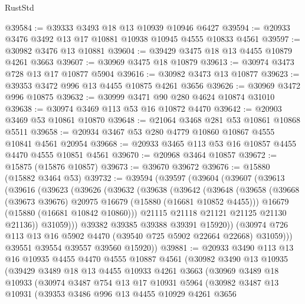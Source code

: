\begin{lexlean}{RustStd}
\begin{coremodule}
@39584 := @39333 @3493 @18 @13 @10939 @10946 @6427
@39594 := @20933 @3476 @3492 @13 @17 @10881 @10938 @10945 @4555 @10833 @4561
@39597 := @30982 @3476 @13 @10881
@39604 := @39429 @3475 @18 @13 @4455 @10879 @4261 @3663
@39607 := @30969 @3475 @18 @10879
@39613 := @30974 @3473 @728 @13 @17 @10877 @5904
@39616 := @30982 @3473 @13 @10877
@39623 := @39353 @3472 @996 @13 @4455 @10875 @4261 @3656
@39626 := @30969 @3472 @996 @10875
@39632 := @30999 @3471 @90 @280 @4624 @10874 @31010
@39638 := @30974 @3469 @113 @53 @16 @10872 @4470
@39642 := @20903 @3469 @53 @10861 @10870
@39648 := @21064 @3468 @281 @53 @10861 @10868 @5511
@39658 := @20934 @3467 @53 @280 @4779 @10860 @10867 @4555 @10841 @4561 @20954
@39668 := @20933 @3465 @113 @53 @16 @10857 @4455 @4470 @4555 @10851 @4561
@39670 := @20968 @3464 @10857
@39672 := @15875 (@15876 @10857)
@39673 := @39670 @39672
@39676 := @15880 (@15882 @3464 @53)
@39732 := @39594
    (@39597
      (@39604
        (@39607
          (@39613
            (@39616
              (@39623
                (@39626
                  (@39632
                    (@39638
                      (@39642
                        (@39648
                          (@39658
                            (@39668 (@39673 @39676) @20975 @16679 (@15880 (@16681 @10852 @4455)))
                            @16679
                            (@15880 (@16681 @10842 @10860)))
                          @21115
                          @21118
                          @21121
                          @21125
                          @21130
                          @21136))
                      @31059)))
                @39382
                @39385
                @39388
                @39391
                @15920))
            (@30974 @726 @113 @13 @16 @5902 @4470 (@39540 @725 @5902 @22664 @22668) @31059)))
        @39551
        @39554
        @39557
        @39560
        @15920))
@39881 := @20933
    @3490
    @113
    @13
    @16
    @10935
    @4455
    @4470
    @4555
    @10887
    @4561
    (@30982
      @3490
      @13
      @10935
      (@39429
        @3489
        @18
        @13
        @4455
        @10933
        @4261
        @3663
        (@30969
          @3489
          @18
          @10933
          (@30974
            @3487
            @754
            @13
            @17
            @10931
            @5964
            (@30982
              @3487
              @13
              @10931
              (@39353
                @3486
                @996
                @13
                @4455
                @10929
                @4261
                @3656

\end{coremodule}
\end{lexlean}
